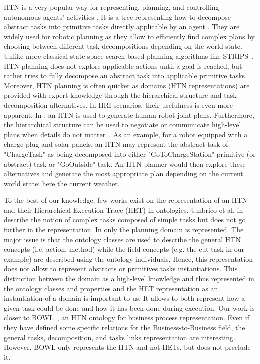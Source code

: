 HTN is a very popular way for representing, planning, and controlling autonomous agents' activities \cite{ghallab_2004_automated, ingrand_2017_deliberation}. It is a tree representing how to decompose abstract tasks into primitive tasks directly applicable by an agent \cite{erol_1994_htn}. They are widely used for robotic planning as they allow to efficiently find complex plans by choosing between different task decompositions depending on the world state. 
Unlike more classical state-space search-based planning algorithms like STRIPS~\cite{fikes_1971_strips}, HTN planning does not explore applicable actions until a goal is reached, but rather tries to fully decompose an abstract task into applicable primitive tasks. Moreover, HTN planning is often quicker as domains (HTN representations) are provided with expert knowledge through the hierarchical structure and task decomposition alternatives. 
In HRI scenarios, their usefulness is even more apparent. In \cite{lallement_2014_hatp}, an HTN is used to generate human-robot joint plans. Furthermore, the hierarchical structure can be used to negotiate or communicate high-level plans when details do not matter~\cite{milliez_2016_using}. As an example, for a robot equipped with a charge plug and solar panels, an HTN may represent the abstract task of "ChargeTask" as being decomposed into either "GoToChargeStation" primitive (or abstract) task or "GoOutside" task. An HTN planner would then explore these alternatives and generate the most appropriate plan depending on the current world state: here the current weather.

To the best of our knowledge, few works exist on the representation of an HTN and their Hierarchical Execution Trace (HET) in ontologies. Umbrico et al. in~\cite{umbrico_2020_ontology} describe the notion of complex tasks composed of simple tasks but does not go further in the representation. In \cite{freitas_2014_using} only the planning domain is represented. The major issue is that the ontology classes are used to describe the general HTN concepts (i.e. action, method) while the field concepts (e.g. the cut task in our example) are described using the ontology individuals. Hence, this representation does not allow to represent abstracts or primitives tasks instantiations. This distinction between the domain as a high-level knowledge and thus represented in the ontology classes and properties and the HET representation as an instantiation of a domain is important to us. It allows to both represent how a given task could be done and how it has been done during execution. Our work is closer to BOWL~\cite{ko_2011_business}, an HTN ontology for business process representation. Even if they have defined some specific relations for the Business-to-Business field, the general tasks, decomposition, and tasks links representation are interesting. However, BOWL only represents the HTN and not HETs, but does not preclude it.

